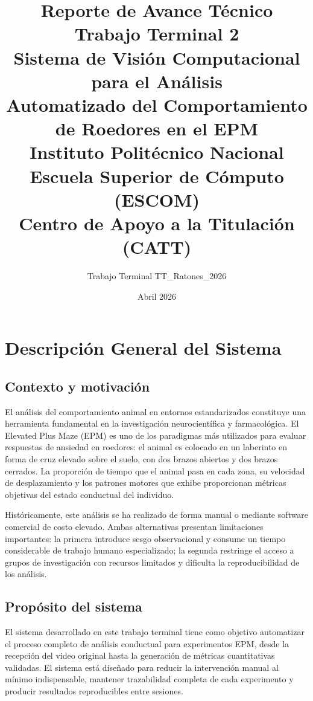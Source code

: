 \documentclass[12pt]{report}
\title{
    \textbf{Reporte de Avance Técnico} \\[0.5em]
    \large Trabajo Terminal 2 \\[0.3em]
    \normalsize Sistema de Visión Computacional para el Análisis \\
    Automatizado del Comportamiento de Roedores en el EPM \\[1em]
    \small Instituto Politécnico Nacional \\
    Escuela Superior de Cómputo (ESCOM) \\
    Centro de Apoyo a la Titulación (CATT)
}
\author{Trabajo Terminal TT\_Ratones\_2026}
\date{Abril 2026}
\begin{document}
\maketitle
\tableofcontents
\clearpage

\chapter{Descripción General del Sistema}

\section{Contexto y motivación}

El análisis del comportamiento animal en entornos estandarizados constituye
una herramienta fundamental en la investigación neurocientífica y farmacológica.
El Elevated Plus Maze (EPM) es uno de los paradigmas más utilizados para evaluar
respuestas de ansiedad en roedores: el animal es colocado en un laberinto en
forma de cruz elevado sobre el suelo, con dos brazos abiertos y dos brazos
cerrados. La proporción de tiempo que el animal pasa en cada zona, su velocidad
de desplazamiento y los patrones motores que exhibe proporcionan métricas
objetivas del estado conductual del individuo.

Históricamente, este análisis se ha realizado de forma manual o mediante
software comercial de costo elevado. Ambas alternativas presentan limitaciones
importantes: la primera introduce sesgo observacional y consume un tiempo
considerable de trabajo humano especializado; la segunda restringe el acceso a
grupos de investigación con recursos limitados y dificulta la reproducibilidad
de los análisis.

\section{Propósito del sistema}

El sistema desarrollado en este trabajo terminal tiene como objetivo automatizar
el proceso completo de análisis conductual para experimentos EPM, desde la
recepción del video original hasta la generación de métricas cuantitativas
validadas. El sistema está diseñado para reducir la intervención manual al
mínimo indispensable, mantener trazabilidad completa de cada experimento y
producir resultados reproducibles entre sesiones.
\end{document}
